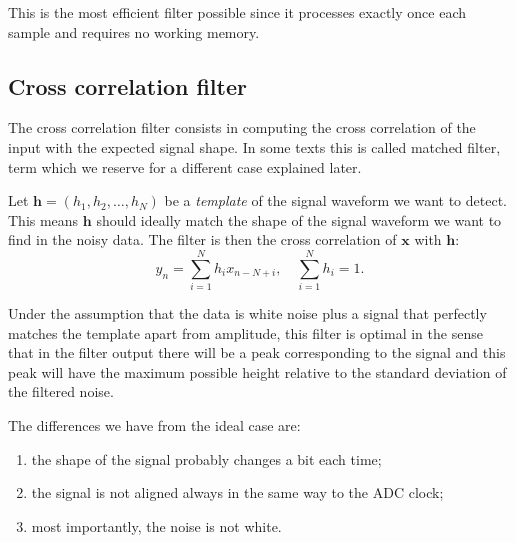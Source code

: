 This is the most efficient filter possible since it processes exactly once each
sample and requires no working memory.

\subsection{Cross correlation filter}

\begin{figure}
    
    

\end{figure}

The cross correlation filter consists in computing the cross correlation of
the input with the expected signal shape. In some texts this is called matched
filter, term which we reserve for a different case explained later.

Let $\mathbf h = (h_1, h_2, \ldots, h_N)$ be a \emph{template} of the signal
waveform we want to detect. This means $\mathbf h$ should ideally match the
shape of the signal waveform we want to find in the noisy data. The filter is
then the cross correlation of $\mathbf x$ with $\mathbf h$:
%
\begin{equation}
    y_n = \sum_{i=1}^N h_i x_{n-N+i}, \quad \sum_{i=1}^N h_i = 1.
\end{equation}

Under the assumption that the data is white noise plus a signal that perfectly
matches the template apart from amplitude, this filter is optimal in the sense
that in the filter output there will be a peak corresponding to the signal and
this peak will have the maximum possible height relative to the standard
deviation of the filtered noise.

The differences we have from the ideal case are:
%
\begin{enumerate}
    \item the shape of the signal probably changes a bit each time;
    \item the signal is not aligned always in the same way to the ADC clock;
    \item most importantly, the noise is not white.
\end{enumerate}

